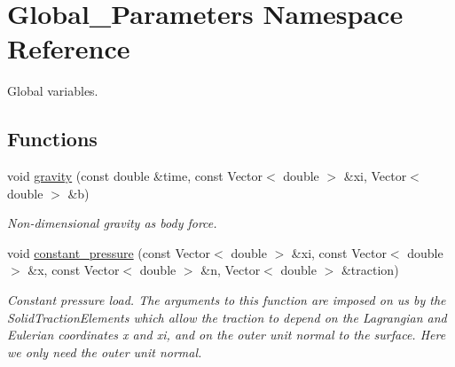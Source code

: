 \hypertarget{namespaceGlobal__Parameters}{}\section{Global\+\_\+\+Parameters Namespace Reference}
\label{namespaceGlobal__Parameters}


Global variables.  


\subsection*{Functions}
\begin{DoxyCompactItemize}
\item 
void \hyperlink{namespaceGlobal__Parameters_a200109847bf4cc26da4d00e8d68d569e}{gravity} (const double \&time, const Vector$<$ double $>$ \&xi, Vector$<$ double $>$ \&b)
\begin{DoxyCompactList}\small\item\em Non-\/dimensional gravity as body force. \end{DoxyCompactList}\item 
void \hyperlink{namespaceGlobal__Parameters_a7dc25ca2abd48b7f1bffb2d6129f02bd}{constant\+\_\+pressure} (const Vector$<$ double $>$ \&xi, const Vector$<$ double $>$ \&x, const Vector$<$ double $>$ \&n, Vector$<$ double $>$ \&traction)
\begin{DoxyCompactList}\small\item\em Constant pressure load. The arguments to this function are imposed on us by the Solid\+Traction\+Elements which allow the traction to depend on the Lagrangian and Eulerian coordinates x and xi, and on the outer unit normal to the surface. Here we only need the outer unit normal. \end{DoxyCompactList}\end{DoxyCompactItemize}
